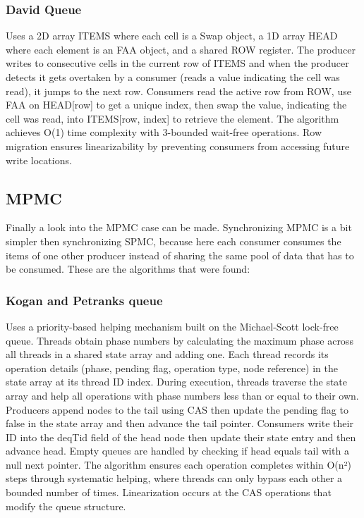 \subsubsection{David Queue} 
Uses a 2D array ITEMS where each cell is a Swap object, a 1D array HEAD where each element is an \ac{FAA} object, and a shared ROW register. The producer writes to consecutive cells in the current row of ITEMS and when the producer detects it gets overtaken by a consumer (reads a value indicating the cell was read), it jumps to the next row. Consumers read the active row from ROW, use \ac{FAA} on HEAD[row] to get a unique index, then swap the value, indicating the cell was read, into ITEMS[row, index] to retrieve the element. The algorithm achieves O(1) time complexity with 3-bounded wait-free operations. Row migration ensures linearizability by preventing consumers from accessing future write locations. \cite{Mateíspmc}

\subsection{\acf{MPMC}}\label{subsec:multiple-producer-and-multiple-consumer}
Finally a look into the \ac{MPMC} case can be made. Synchronizing \ac{MPMC} is a bit simpler then synchronizing \ac{SPMC}, because here each consumer consumes the items of one other producer instead of sharing the same pool of data that has to be consumed. These are the algorithms that were found:

\subsubsection{Kogan and Petranks queue} 
Uses a priority-based helping mechanism built on the Michael-Scott lock-free queue. Threads obtain phase numbers by calculating the maximum phase across all threads in a shared state array and adding one. Each thread records its operation details (phase, pending flag, operation type, node reference) in the state array at its thread ID index. During execution, threads traverse the state array and help all operations with phase numbers less than or equal to their own. Producers append nodes to the tail using \ac{CAS} then update the pending flag to false in the state array and then advance the tail pointer. Consumers write their ID into the deqTid field of the head node then update their state entry and then advance head. Empty queues are handled by checking if head equals tail with a null next pointer. The algorithm ensures each operation completes within O(n²) steps through systematic helping, where threads can only bypass each other a bounded number of times. Linearization occurs at the \ac{CAS} operations that modify the queue structure. \cite{Kogan2011WaitFreeQueues}

